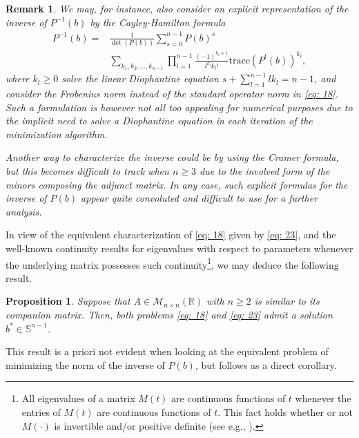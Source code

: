 \documentclass[journal,twoside,web]{ieeecolor}
\newcommand{\R}{\mathbb{R}}
\newtheorem{remark}{Remark}
\newtheorem{proposition}{Proposition}
\begin{document}
	\begin{remark}
	We may, for instance, also consider an explicit representation of the inverse of $P^{-1}(b)$ by the Cayley-Hamilton formula
	\begin{align*}
	P^{-1}(b) = &{\frac {1}{\det(P(b))}}\sum _{s=0}^{n-1}P(b)^{s}\\
	&\sum _{k_{1},k_{2},\ldots ,k_{n-1}}\prod _{l=1}^{n-1}{\frac {(-1)^{k_{l}+1}}{l^{k_{l}}k_{l}!}}\mathrm{trace}(P^{l}(b))^{k_{l}},
	\end{align*}
	where $k_l\geqslant0$ solve the linear Diophantine equation $\displaystyle s+\sum _{l=1}^{n-1}lk_{l}=n-1$, and consider the Frobenius norm instead of the standard operator norm in \eqref{eq: 18}. 
	 Such a formulation is however not all too appealing for numerical purposes due to the implicit need to solve a Diophantine equation in each iteration of the minimization algorithm.
	
	Another way to characterize the inverse could be by using the Cramer formula, but this becomes difficult to track when $n\geqslant3$ due to the involved form of the minors composing the adjunct matrix. In any case, such explicit formulas for the inverse of $P(b)$ appear quite convoluted and difficult to use for a further analysis.
	\end{remark}
	\medskip
	 
	 \noindent
	In view of the equivalent characterization of \eqref{eq: 18} given by \eqref{eq: 23}, and the well-known continuity results for eigenvalues with respect to parameters whenever the underlying matrix possesses such continuity\footnote{All eigenvalues of a matrix $M(t)$ are continuous functions of $t$ whenever the entries of $M(t)$ are continuous functions of $t$. This fact holds whether or not $M(\cdot)$ is invertible and/or positive definite (see e.g., \cite[pp. 116]{kato2013perturbation}).}, we may deduce the following result. 
	\medskip
	
	\begin{proposition} \label{prop: existence}
	Suppose that $A\in\mathcal{M}_{n\times n}(\R)$ with $n\geqslant2$ is similar to its companion matrix. 
	Then, both problems \eqref{eq: 18} and \eqref{eq: 23} admit a solution $b^* \in \mathbb{S}^{n-1}$.
	\end{proposition}
	\medskip
	
	\noindent
	This result is a priori not evident when looking at the equivalent problem of minimizing the norm of the inverse of $P(b)$, but follows as a direct corollary.
	
\end{document}
